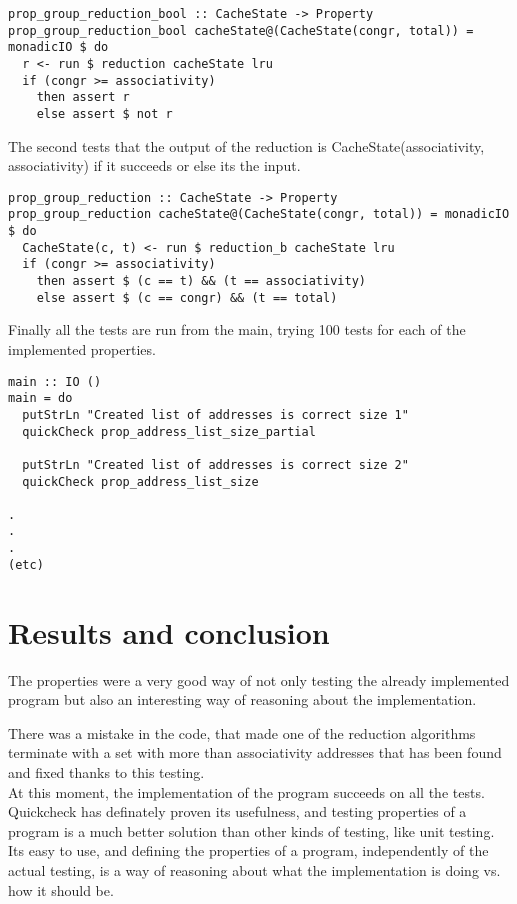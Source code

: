 \documentclass[11pt]{article}
\begin{document}
\begin{verbatim}
prop_group_reduction_bool :: CacheState -> Property
prop_group_reduction_bool cacheState@(CacheState(congr, total)) = monadicIO $ do
  r <- run $ reduction cacheState lru
  if (congr >= associativity)
    then assert r
    else assert $ not r
\end{verbatim}

The second tests that the output of the reduction is CacheState(associativity, associativity) if it succeeds or else its the input.
\begin{verbatim}
prop_group_reduction :: CacheState -> Property
prop_group_reduction cacheState@(CacheState(congr, total)) = monadicIO $ do
  CacheState(c, t) <- run $ reduction_b cacheState lru
  if (congr >= associativity)
    then assert $ (c == t) && (t == associativity)
    else assert $ (c == congr) && (t == total)
\end{verbatim}

Finally all the tests are run from the main, trying 100 tests for each of the implemented properties.
\begin{verbatim}
main :: IO ()
main = do
  putStrLn "Created list of addresses is correct size 1"
  quickCheck prop_address_list_size_partial
  
  putStrLn "Created list of addresses is correct size 2"
  quickCheck prop_address_list_size

.
.
.
(etc)
\end{verbatim}

\clearpage
\section{Results and conclusion}
The properties were a very good way of not only testing the already implemented program but also an interesting way of reasoning about the implementation.

There was a mistake in the code, that made one of the reduction algorithms terminate with a set with more than associativity addresses that has been found and fixed thanks to this testing.\\

At this moment, the implementation of the program succeeds on all the tests.\\

Quickcheck has definately proven its usefulness, and testing properties of a program is a much better solution than other kinds of testing, like unit testing. Its easy to use, and defining the properties of a program, independently of the actual testing, is a way of reasoning about what the implementation is doing vs. how it should be.

\clearpage



\clearpage
\end{document}
